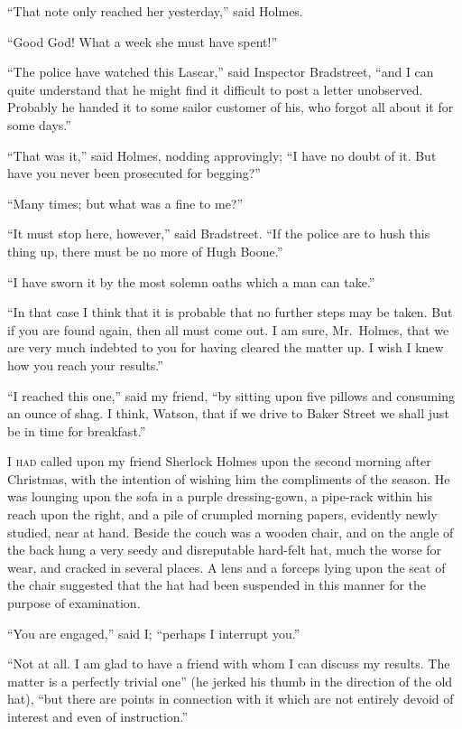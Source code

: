 “That note only reached her yesterday,” said Holmes.

“Good God! What a week she must have spent!”

“The police have watched this Lascar,” said Inspector
Bradstreet, “and I can quite understand that he might find it
difficult to post a letter unobserved. Probably he handed it
to some sailor customer of his, who forgot all about it for some
days.”

“That was it,” said Holmes, nodding approvingly; “I have
no doubt of it. But have you never been prosecuted for
begging?”

“Many times; but what was a fine to me?”

“It must stop here, however,” said Bradstreet. “If the
police are to hush this thing up, there must be no more of
Hugh Boone.”

“I have sworn it by the most solemn oaths which a man
can take.”

“In that case I think that it is probable that no further
steps may be taken. But if you are found again, then all must
come out. I am sure, Mr.~Holmes, that we are very much indebted
to you for having cleared the matter up. I wish I
knew how you reach your results.”

“I reached this one,” said my friend, “by sitting upon five
pillows and consuming an ounce of shag. I think, Watson,
that if we drive to Baker Street we shall just be in time for
breakfast.”


\textsc{I had} called upon my friend Sherlock Holmes
upon the second morning after Christmas, with
the intention of wishing him the compliments of
the season. He was lounging upon the sofa in a
purple dressing-gown, a pipe-rack within his reach upon the
right, and a pile of crumpled morning papers, evidently newly
studied, near at hand. Beside the couch was a wooden chair,
and on the angle of the back hung a very seedy and disreputable
hard-felt hat, much the worse for wear, and cracked in
several places. A lens and a forceps lying upon the seat of
the chair suggested that the hat had been suspended in this
manner for the purpose of examination.

“You are engaged,” said I; “perhaps I interrupt you.”

“Not at all. I am glad to have a friend with whom I can
discuss my results. The matter is a perfectly trivial one” (he
jerked his thumb in the direction of the old hat), “but there
are points in connection with it which are not entirely devoid
of interest and even of instruction.”


